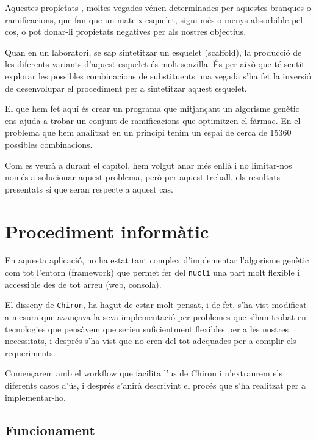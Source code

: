 	Aquestes propietats , moltes vegades vénen determinades per aquestes
	branques o ramificacions, que fan que un mateix esquelet, sigui més o menys
	absorbible pel cos, o pot donar-li propietats negatives per als nostres
	objectius.

	Quan en un laboratori, se sap sintetitzar un esquelet (scaffold), la
	producció de les diferents variants d'aquest esquelet és molt senzilla.  És
	per això que té sentit explorar les possibles combinacions de substituents 
        una vegada s'ha fet la inversió de desenvolupar el procediment per a
        sintetitzar aquest esquelet.

	El que hem fet aquí és crear un programa que mitjançant un algorisme genètic
	ens ajuda a trobar un conjunt de ramificacions que optimitzen el fàrmac.  En
	el problema que hem analitzat en un principi tenim un espai de cerca de
	15360 possibles combinacions.

	Com es veurà a durant el capítol, hem volgut anar més enllà i no limitar-nos
	només a solucionar aquest problema, però per aquest treball, els resultats
	presentats sí que seran respecte a aquest cas.

\section{Procediment informàtic} %
\label{sec:Procediment informatic}

En aquesta aplicació, no ha estat tant complex d'implementar l'algorisme genètic
com tot l'entorn (framework) que permet fer del \texttt{nucli} una part molt
flexible i accessible des de tot arreu (web, consola).

El disseny de \texttt{Chiron}, ha hagut de estar molt pensat, i de fet, s'ha vist
modificat a mesura que avançava la seva implementació per problemes que s'han
trobat en tecnologies que pensàvem que serien suficientment flexibles per a les
nostres necessitats, i després s'ha vist que no eren del tot adequades per a
complir els requeriments.

Començarem amb el workflow que facilita l'us de Chiron i n'extraurem els
diferents casos d'ús, i després s'anirà descrivint el procés que s'ha realitzat
per a implementar-ho.

\subsection{Funcionament} %
\label{sub:Funcionament}

